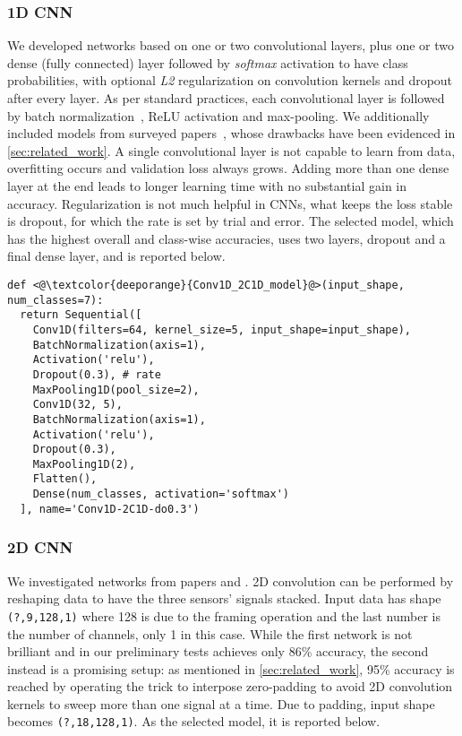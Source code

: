 \subsubsection{1D CNN}

We developed networks based on one or two convolutional layers, plus one or two dense (fully connected) layer followed by \textit{softmax} activation to have class probabilities, with optional \textit{L2} regularization on convolution kernels and dropout after every layer.
As per standard practices, each convolutional layer is followed by batch normalization~\cite{Ioffe-BatchNorm}, ReLU activation and max-pooling.
We additionally included models from surveyed papers~\cite{Chen-SingleAcc,Rueda-CNN}, whose drawbacks have been evidenced in \autoref{sec:related_work}.
A single convolutional layer is not capable to learn from data, overfitting occurs and validation loss always grows.
Adding more than one dense layer at the end leads to longer learning time with no substantial gain in accuracy.
Regularization is not much helpful in CNNs, what keeps the loss stable is dropout, for which the rate is set by trial and error.
The selected model, which has the highest overall and class-wise accuracies, uses two layers, dropout and a final dense layer, and is reported below.

\begin{minipage}[c]{.9\columnwidth}
\vspace*{.5em}
\begin{lstlisting}
def <@\textcolor{deeporange}{Conv1D_2C1D_model}@>(input_shape, num_classes=7):
  return Sequential([
    Conv1D(filters=64, kernel_size=5, input_shape=input_shape),
    BatchNormalization(axis=1),
    Activation('relu'),
    Dropout(0.3), # rate
    MaxPooling1D(pool_size=2),
    Conv1D(32, 5),
    BatchNormalization(axis=1),
    Activation('relu'),
    Dropout(0.3),
    MaxPooling1D(2),
    Flatten(),
    Dense(num_classes, activation='softmax')
  ], name='Conv1D-2C1D-do0.3')
\end{lstlisting}
\vspace*{.2em}
\end{minipage}

\subsubsection{2D CNN}

We investigated networks from papers \cite{Bevilacqua-CNN} and \cite{Ha-MultiModalCNN}.
2D convolution can be performed by reshaping data to have the three sensors' signals stacked.
Input data has shape \texttt{(?,9,128,1)} where 128 is due to the framing operation and the last number is the number of channels, only 1 in this case.
While the first network is not brilliant and in our preliminary tests achieves only 86\% accuracy, the second instead is a promising setup: as mentioned in \autoref{sec:related_work}, 95\% accuracy is reached by operating the trick to interpose zero-padding to avoid 2D convolution kernels to sweep more than one signal at a time.
Due to padding, input shape becomes \texttt{(?,18,128,1)}.
As the selected model, it is reported below.

